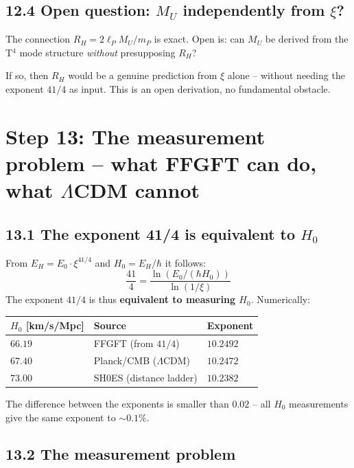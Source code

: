 \subsection*{12.4 Open question: $M_U$ independently from $\xi$?}

The connection $R_H = 2\ell_P M_U/m_P$ is exact.
Open is: can $M_U$ be derived from the T$^4$ mode structure
\emph{without} presupposing $R_H$?

If so, then $R_H$ would be a genuine prediction from $\xi$ alone --
without needing the exponent $41/4$ as input.
This is an open derivation, no fundamental obstacle.

\section{Step 13: The measurement problem -- what FFGFT can do, what $\Lambda$CDM cannot}

\subsection*{13.1 The exponent 41/4 is equivalent to $H_0$}

From $E_H = E_0 \cdot \xi^{41/4}$ and $H_0 = E_H/\hbar$ it follows:
\[
  \frac{41}{4} = \frac{\ln(E_0/(\hbar H_0))}{\ln(1/\xi)}
\]
The exponent $41/4$ is thus \textbf{equivalent to measuring $H_0$}.
Numerically:

\begin{center}
\begin{tabular}{lll}
\toprule
$H_0$ [km/s/Mpc] & Source & Exponent \\
\midrule
$66{.}19$ & FFGFT (from $41/4$) & $10{.}2492$ \\
$67{.}40$ & Planck/CMB ($\Lambda$CDM) & $10{.}2472$ \\
$73{.}00$ & SH0ES (distance ladder) & $10{.}2382$ \\
\bottomrule
\end{tabular}
\end{center}

The difference between the exponents is smaller than $0{.}02$ --
all $H_0$ measurements give the same exponent to $\sim 0{.}1\%$.

\subsection*{13.2 The measurement problem}

